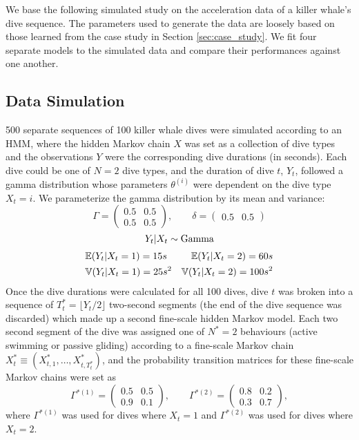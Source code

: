 

We base the following simulated study on the acceleration data of a killer whale's dive sequence. The parameters used to generate the data are loosely based on those learned from the case study in Section \ref{sec:case_study}. We fit four separate models to the simulated data and compare their performances against one another.

\subsection{Data Simulation}

500 separate sequences of 100 killer whale dives were simulated according to an HMM, where the hidden Markov chain $X$ was set as a collection of dive types and the observations $Y$ were the corresponding dive durations (in seconds). Each dive could be one of $N=2$ dive types, and the duration of dive $t$, $Y_t$, followed a gamma distribution whose parameters $\theta^{(i)}$ were dependent on the dive type $X_t = i$. We parameterize the gamma distribution by its mean and variance:
%
$$\Gamma = \begin{pmatrix} 0.5 & 0.5 \\ 0.5 & 0.5 \end{pmatrix}, \qquad \delta =  \begin{pmatrix} 0.5 & 0.5 \end{pmatrix}$$
$$Y_t|X_t \sim \rm{Gamma} $$
\begin{align*}
	&\mathbb{E}(Y_t|X_t = 1) = 15 s &\mathbb{E}(Y_t|X_t = 2) = 60 s \\
	&\mathbb{V}(Y_t|X_t = 1) = 25 s^2 &\mathbb{V}(Y_t|X_t = 2) = 100 s^2
\end{align*}
%
Once the dive durations were calculated for all 100 dives, dive $t$ was broken into a sequence of $T^*_t = \lfloor Y_t/2 \rfloor$ two-second segments (the end of the dive sequence was discarded) which made up a second fine-scale hidden Markov model. Each two second segment of the dive was assigned one of $N^*=2$ behaviours (active swimming or passive gliding) according to a fine-scale Markov chain $X^*_t \equiv \left(X^*_{t,1}, \ldots, X^*_{t,T^*_t} \right)$, and the probability transition matrices for these fine-scale Markov chains were set as
%
$$\Gamma^{*(1)} = \begin{pmatrix} 0.5 & 0.5 \\ 0.9 & 0.1 \end{pmatrix}, \qquad \Gamma^{*(2)} = \begin{pmatrix} 0.8 & 0.2 \\ 0.3 & 0.7 \end{pmatrix},$$ 
%
where $\Gamma^{*(1)}$ was used for dives where $X_t = 1$ and $\Gamma^{*(2)}$ was used for dives where $X_t = 2$. 

